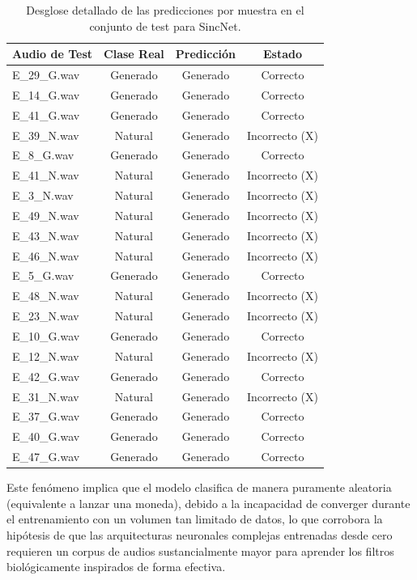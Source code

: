 \begin{table}[h!]
\centering
\begin{tabular}{l|c|c|c}
\toprule
\textbf{Audio de Test} & \textbf{Clase Real} & \textbf{Predicción} & \textbf{Estado} \\
\midrule
E\_29\_G.wav & Generado & Generado & Correcto \\
E\_14\_G.wav & Generado & Generado & Correcto \\
E\_41\_G.wav & Generado & Generado & Correcto \\
E\_39\_N.wav & Natural  & Generado & Incorrecto (X) \\
E\_8\_G.wav  & Generado & Generado & Correcto \\
E\_41\_N.wav & Natural  & Generado & Incorrecto (X) \\
E\_3\_N.wav  & Natural  & Generado & Incorrecto (X) \\
E\_49\_N.wav & Natural  & Generado & Incorrecto (X) \\
E\_43\_N.wav & Natural  & Generado & Incorrecto (X) \\
E\_46\_N.wav & Natural  & Generado & Incorrecto (X) \\
E\_5\_G.wav  & Generado & Generado & Correcto \\
E\_48\_N.wav & Natural  & Generado & Incorrecto (X) \\
E\_23\_N.wav & Natural  & Generado & Incorrecto (X) \\
E\_10\_G.wav & Generado & Generado & Correcto \\
E\_12\_N.wav & Natural  & Generado & Incorrecto (X) \\
E\_42\_G.wav & Generado & Generado & Correcto \\
E\_31\_N.wav & Natural  & Generado & Incorrecto (X) \\
E\_37\_G.wav & Generado & Generado & Correcto \\
E\_40\_G.wav & Generado & Generado & Correcto \\
E\_47\_G.wav & Generado & Generado & Correcto \\
\bottomrule
\end{tabular}
\caption{Desglose detallado de las predicciones por muestra en el conjunto de test para SincNet.}
\label{tab:detalle_predicciones_sincnet}
\end{table}

Este fenómeno implica que el modelo clasifica de manera puramente aleatoria (equivalente a lanzar una moneda), debido a la incapacidad de converger durante el entrenamiento con un volumen tan limitado de datos, lo que corrobora la hipótesis de que las arquitecturas neuronales complejas entrenadas desde cero requieren un corpus de audios sustancialmente mayor para aprender los filtros biológicamente inspirados de forma efectiva.


